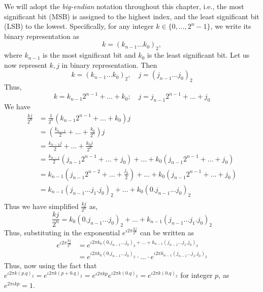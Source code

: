 We will adopt the \textit{big-endian} notation throughout this chapter, i.e., the most significant bit (MSB) is assigned to the highest index, and the least significant bit (LSB) to the lowest. Specifically, for any integer \( k \in \{0, \dots, 2^n - 1\} \), we write its binary representation as
\[
k = (k_{n-1} \ldots k_0)_2,
\]
where \( k_{n-1} \) is the most significant bit and \( k_0 \) is the least significant bit.
Let us now represent $k,j$ in binary representation. Then
\[
k=(k_{n-1}\ldots k_0)_2, \quad j=(j_{n-1}\ldots j_0)_2
\]
Thus, 
\[
k=k_{n-1}2^{n-1}+\ldots+k_0; \quad j=j_{n-1}2^{n-1}+\ldots +j_0
\]
We have
\begin{align*}
\frac{kj}{2^n}&=\frac{1}{2^n}(k_{n-1}2^{n-1}+\ldots+k_0)j\\
&=\left(\frac{k_{n-1}}{2}+\ldots+\frac{k_0}{2^n}\right)j\\
&=\frac{k_{n-1}j}{2}+\ldots+\frac{k_0j}{2^n}\\
&=\frac{k_{n-1}}{2}\left(j_{n-1}2^{n-1}+\ldots +j_0\right)+\ldots + k_0\left(j_{n-1}2^{n-1}+\ldots +j_0\right)\\
&=k_{n-1}(j_{n-1}2^{n-2}+\ldots+\frac{j_0}{2})+\ldots +k_0(j_{n-1}2^{n-1}+\ldots+j_0)\\
&=k_{n-1}(j_{n-1}\ldots j_1.j_0)_2+\ldots +k_0(0.j_{n-1}\ldots j_0)_2\\
\end{align*}
Thus we have simplified $\frac{kj}{2^n}$ as,
\begin{equation}
    \frac{kj}{2^n}=k_0(0.j_{n-1}\ldots j_0)_2+\ldots +k_{n-1}(j_{n-1}\ldots j_1.j_0)_2
    \label{eq:kjN}
\end{equation}
Thus, substituting in the exponential $e^{\iota 2\pi \frac{kj}{2^n}}$ can be written as
\begin{align*}
    e^{\iota 2\pi \frac{kj}{2^n}}&=e^{\iota 2\pi k_0(0.j_{n-1}\ldots j_0)_2+\ldots +k_{n-1}(j_{n-1}\ldots j_1.j_0)_2}\\
    &=e^{\iota 2\pi k_0(0.j_{n-1}\ldots j_0)_2}\cdot \ldots \cdot e^{\iota 2\pi k_{n-1}(j_{n-1}\ldots j_1.j_0)_2}
\end{align*}
Thus, now using the fact that $e^{\iota 2\pi k(p.q)_2}=e^{\iota 2 \pi k (p+0.q)_2}=e^{\iota 2 \pi kp}e^{\iota 2 \pi k(0.q)_2}=e^{\iota 2 \pi k (0.q)_2}$ for integer $p$, as $e^{2\pi\iota kp}=1$.
